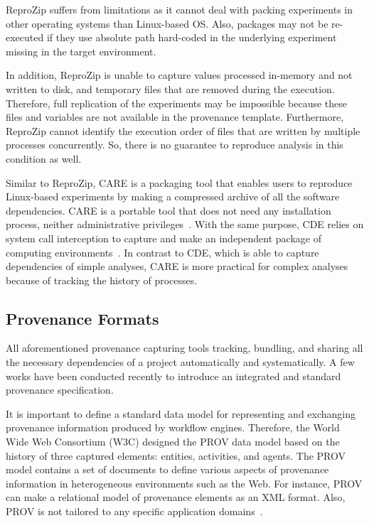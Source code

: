 ReproZip suffers from limitations as it cannot deal with 
packing experiments in other operating systems than
Linux-based OS. Also, packages may not be re-executed if they use 
absolute path hard-coded in the underlying experiment 
missing in the target environment. 

In addition, ReproZip is unable to capture values processed in-memory 
and not written to disk, and temporary files that are removed 
during the execution. Therefore, full replication of the experiments 
may be impossible because these files and variables are 
not available in the provenance template. 
Furthermore, ReproZip cannot 
identify the execution order of files that are written by multiple 
processes concurrently. So, there is no guarantee to reproduce analysis 
in this condition as well.

Similar to ReproZip, CARE is a packaging tool 
that enables users to reproduce Linux-based experiments by making a 
compressed archive of all the software dependencies. CARE is a portable 
tool that does not need any 
installation process, neither administrative 
privileges~\cite{janin2014care}. With the same purpose, CDE
relies on system call interception to capture and make an independent 
package of computing environments~\cite{guo2012cde}. In contrast to CDE, 
which is able to capture dependencies of simple analyses, CARE is more 
practical for complex analyses because of tracking the history of 
processes. 


\subsection{Provenance Formats}

All aforementioned provenance capturing tools
tracking, bundling, and sharing all the necessary dependencies of 
a project automatically and systematically. A few works have been conducted 
recently to introduce an integrated and standard provenance 
specification. 

It is important to define a standard data model for representing and 
exchanging provenance information produced by workflow engines.
Therefore, the World Wide Web Consortium (W3C) designed the 
PROV data model based on the history of three captured elements: 
entities, activities, and agents. The PROV model contains a 
set of documents to define various aspects of provenance information in 
heterogeneous environments such as the Web. For instance, PROV can make a 
relational model of provenance elements as an XML format. Also, 
PROV is not tailored to any specific application 
domains~\cite{cheney2012principles, missier2013w3c}.

